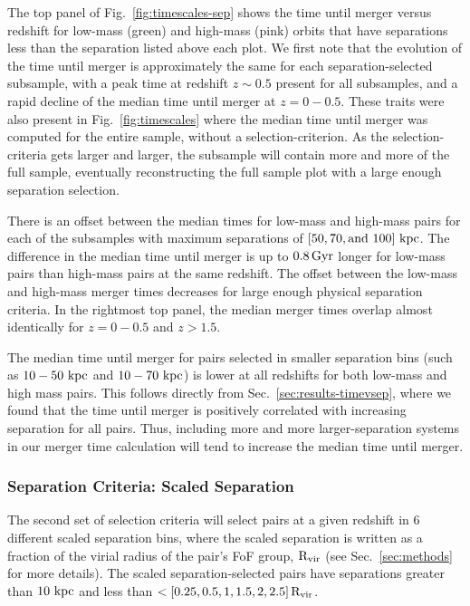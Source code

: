 \documentclass[twocolumn,linenumbers]{aastex631}
\newcommand{\Rvir}{\ensuremath{\rm R_{vir}}}
\begin{document}
The top panel of Fig.~\ref{fig:timescales-sep} shows the time until merger versus redshift for low-mass (green) and high-mass (pink) orbits that have separations less than the separation listed above each plot.  
We first note that the evolution of the time until merger is approximately the same for each separation-selected subsample, with a peak time at redshift $z\sim0.5$ present for all subsamples, and a rapid decline of the median time until merger at $z=0-0.5$. 
These traits were also present in Fig.~\ref{fig:timescales} where the median time until merger was computed for the entire sample, without a selection-criterion.
As the selection-criteria gets larger and larger, the subsample will contain more and more of the full sample, eventually reconstructing the full sample plot with a large enough separation selection.

There is an offset between the median times for low-mass and high-mass pairs for each of the subsamples with maximum separations of $[50, 70, \mbox{and } 100]\,\mathrm{\,kpc}$. 
The difference in the median time until merger is up to $0.8\,\mathrm{Gyr}$ longer for low-mass pairs than high-mass pairs at the same redshift. 
The offset between the low-mass and high-mass merger times decreases for large enough physical separation criteria. 
In the rightmost top panel, the median merger times overlap almost identically for $z=0-0.5$ and $z>1.5$. 

The median time until merger for pairs selected in smaller separation bins (such as $10-50\,\mathrm{\,kpc}$ and $10-70\,\mathrm{\,kpc}$) is lower at all redshifts for both low-mass and high mass pairs. 
This follows directly from Sec.~\ref{sec:results-timevsep}, where we found that the time until merger is positively correlated with increasing separation for all pairs. 
Thus, including more and more larger-separation systems in our merger time calculation will tend to increase the median time until merger. 

\subsubsection{Separation Criteria: Scaled Separation}
The second set of selection criteria will select pairs at a given redshift in 6 different scaled separation bins, where the scaled separation is written as a fraction of the virial radius of the pair's FoF group, $\Rvir$ (see Sec.~\ref{sec:methods} for more details). 
The scaled separation-selected pairs have separations greater than $10\,\mathrm{\,kpc}$ and less than $<[0.25, 0.5, 1, 1.5, 2, 2.5]\,\Rvir$. 
\end{document}

